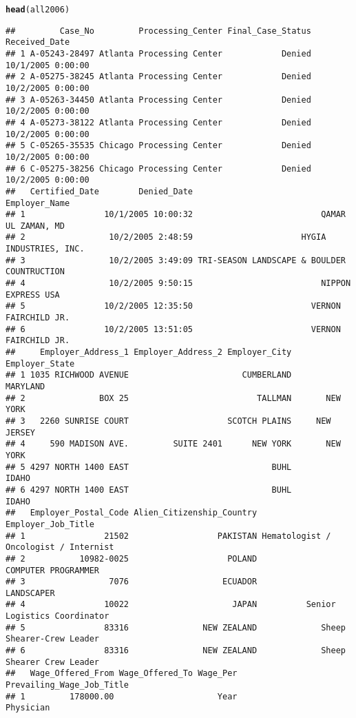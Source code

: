 \documentclass{article}\usepackage{graphicx, color}
\makeatletter
\newcommand{\hlfunctioncall}[1]{\textcolor[rgb]{0.501960784313725,0,0.329411764705882}{\textbf{#1}}}%
\newenvironment{kframe}{%
 \def\at@end@of@kframe{}%
 \ifinner\ifhmode%
  \def\at@end@of@kframe{\end{minipage}}%
  \begin{minipage}{\columnwidth}%
 \fi\fi%
 \def\FrameCommand##1{\hskip\@totalleftmargin \hskip-\fboxsep
 \colorbox{shadecolor}{##1}\hskip-\fboxsep
     \hskip-\linewidth \hskip-\@totalleftmargin \hskip\columnwidth}%
 \MakeFramed {\advance\hsize-\width
   \@totalleftmargin\z@ \linewidth\hsize
   \@setminipage}}%
 {\par\unskip\endMakeFramed%
 \at@end@of@kframe}
\newenvironment{knitrout}{}{} %
\makeatother
\begin{document}
\begin{knitrout}
\begin{kframe}
\begin{alltt}
\hlfunctioncall{head}(all2006)
\end{alltt}
\begin{verbatim}
##         Case_No         Processing_Center Final_Case_Status     Received_Date
## 1 A-05243-28497 Atlanta Processing Center            Denied 10/1/2005 0:00:00
## 2 A-05275-38245 Atlanta Processing Center            Denied 10/2/2005 0:00:00
## 3 A-05263-34450 Atlanta Processing Center            Denied 10/2/2005 0:00:00
## 4 A-05273-38122 Atlanta Processing Center            Denied 10/2/2005 0:00:00
## 5 C-05265-35535 Chicago Processing Center            Denied 10/2/2005 0:00:00
## 6 C-05275-38256 Chicago Processing Center            Denied 10/2/2005 0:00:00
##   Certified_Date        Denied_Date                               Employer_Name
## 1                10/1/2005 10:00:32                          QAMAR UL ZAMAN, MD
## 2                 10/2/2005 2:48:59                      HYGIA INDUSTRIES, INC.
## 3                 10/2/2005 3:49:09 TRI-SEASON LANDSCAPE & BOULDER COUNTRUCTION
## 4                 10/2/2005 9:50:15                          NIPPON EXPRESS USA
## 5                10/2/2005 12:35:50                        VERNON FAIRCHILD JR.
## 6                10/2/2005 13:51:05                        VERNON FAIRCHILD JR.
##     Employer_Address_1 Employer_Address_2 Employer_City Employer_State
## 1 1035 RICHWOOD AVENUE                       CUMBERLAND       MARYLAND
## 2               BOX 25                          TALLMAN       NEW YORK
## 3   2260 SUNRISE COURT                    SCOTCH PLAINS     NEW JERSEY
## 4     590 MADISON AVE.         SUITE 2401      NEW YORK       NEW YORK
## 5 4297 NORTH 1400 EAST                             BUHL          IDAHO
## 6 4297 NORTH 1400 EAST                             BUHL          IDAHO
##   Employer_Postal_Code Alien_Citizenship_Country                    Employer_Job_Title
## 1                21502                  PAKISTAN Hematologist / Oncologist / Internist
## 2           10982-0025                    POLAND                   COMPUTER PROGRAMMER
## 3                 7076                   ECUADOR                            LANDSCAPER
## 4                10022                     JAPAN          Senior Logistics Coordinator
## 5                83316               NEW ZEALAND             Sheep Shearer-Crew Leader
## 6                83316               NEW ZEALAND             Sheep Shearer Crew Leader
##   Wage_Offered_From Wage_Offered_To Wage_Per            Prevailing_Wage_Job_Title
## 1         178000.00                     Year                            Physician

\end{verbatim}
\end{kframe}
\end{knitrout}
\end{document}

